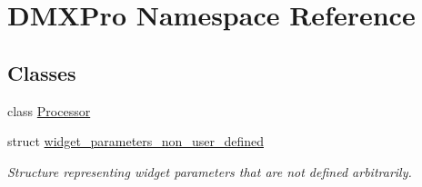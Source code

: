 \hypertarget{namespaceDMXPro}{}\section{D\+M\+X\+Pro Namespace Reference}
\label{namespaceDMXPro}
\subsection*{Classes}
\begin{DoxyCompactItemize}
\item 
class \hyperlink{classDMXPro_1_1Processor}{Processor}
\item 
struct \hyperlink{structDMXPro_1_1widget__parameters__non__user__defined}{widget\+\_\+parameters\+\_\+non\+\_\+user\+\_\+defined}
\begin{DoxyCompactList}\small\item\em Structure representing widget parameters that are not defined arbitrarily. \end{DoxyCompactList}\end{DoxyCompactItemize}
